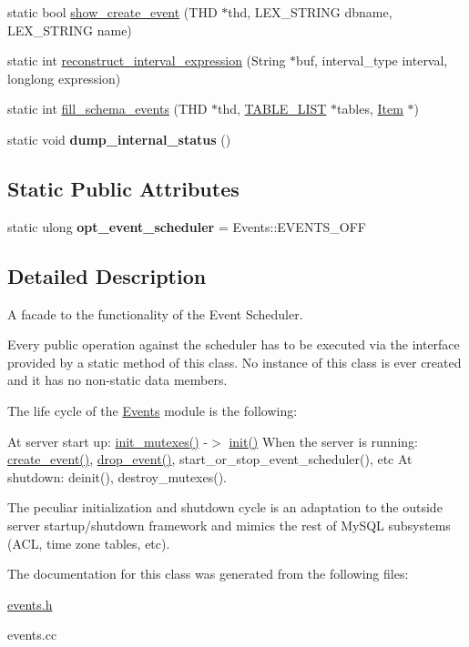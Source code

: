 \begin{DoxyCompactItemize}
\item 
static bool \mbox{\hyperlink{group__Event__Scheduler_ga99ad9b87a2e1ce1b69c8f9c31e4ee5d1}{show\+\_\+create\+\_\+event}} (T\+HD $\ast$thd, L\+E\+X\+\_\+\+S\+T\+R\+I\+NG dbname, L\+E\+X\+\_\+\+S\+T\+R\+I\+NG name)
\item 
static int \mbox{\hyperlink{group__Event__Scheduler_gafb6d2b26338cb92f01504ba32e0ecdf7}{reconstruct\+\_\+interval\+\_\+expression}} (String $\ast$buf, interval\+\_\+type interval, longlong expression)
\item 
static int \mbox{\hyperlink{group__Event__Scheduler_gae80cc405efbd8816c70a163818854645}{fill\+\_\+schema\+\_\+events}} (T\+HD $\ast$thd, \mbox{\hyperlink{structTABLE__LIST}{T\+A\+B\+L\+E\+\_\+\+L\+I\+ST}} $\ast$tables, \mbox{\hyperlink{classItem}{Item}} $\ast$)
\item 
static void {\bfseries dump\+\_\+internal\+\_\+status} ()
\end{DoxyCompactItemize}
\subsection*{Static Public Attributes}
\begin{DoxyCompactItemize}
\item 
static ulong {\bfseries opt\+\_\+event\+\_\+scheduler} = Events\+::\+E\+V\+E\+N\+T\+S\+\_\+\+O\+FF
\end{DoxyCompactItemize}


\subsection{Detailed Description}
A facade to the functionality of the Event Scheduler. 

Every public operation against the scheduler has to be executed via the interface provided by a static method of this class. No instance of this class is ever created and it has no non-\/static data members.

The life cycle of the \mbox{\hyperlink{classEvents}{Events}} module is the following\+:

At server start up\+: \mbox{\hyperlink{group__Event__Scheduler_gaa26988f7ec7f5d0053af28a5d8586236}{init\+\_\+mutexes()}} -\/$>$ \mbox{\hyperlink{group__Event__Scheduler_gaa1df78d5847482dc1712c780dfd44b9a}{init()}} When the server is running\+: \mbox{\hyperlink{group__Event__Scheduler_ga8fbb9616149b046c5cc59eb889d6f809}{create\+\_\+event()}}, \mbox{\hyperlink{group__Event__Scheduler_gac4837ceab76a62f91e99c63a718e7da9}{drop\+\_\+event()}}, start\+\_\+or\+\_\+stop\+\_\+event\+\_\+scheduler(), etc At shutdown\+: deinit(), destroy\+\_\+mutexes().

The peculiar initialization and shutdown cycle is an adaptation to the outside server startup/shutdown framework and mimics the rest of My\+S\+QL subsystems (A\+CL, time zone tables, etc). 

The documentation for this class was generated from the following files\+:\begin{DoxyCompactItemize}
\item 
\mbox{\hyperlink{events_8h}{events.\+h}}\item 
events.\+cc\end{DoxyCompactItemize}

